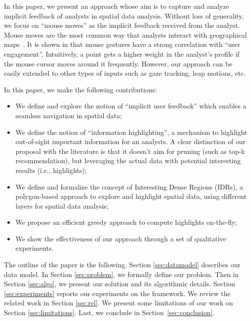 \documentclass[sigconf,edbt]{acmart-edbt2019}
\begin{document}
\vspace{2pt}
In this paper, we present an approach whose aim is to capture and analyze implicit feedback of analysts in spatial data analysis. Without loss of generality, we focus on ``mouse moves'' as the implicit feedback received from the analyst. Mouse moves are the most common way that analysts interact with geographical maps~\cite{Chen:2001}. It is shown in \cite{Arapakis:2014} that mouse gestures have a strong correlation with ``user engagement''. Intuitively, a point gets a higher weight in the analyst's profile if the mouse cursor moves around it frequently.  However, our approach can be easily extended to other types of inputs such as gaze tracking, leap motions, etc.

\vspace{2pt}
 In this paper, we make the following contributions:

\begin{itemize}[leftmargin=*]
  \item We define and explore the notion of ``implicit user feedback'' which enables a seamless navigation in spatial data;
  \item We define the notion of ``information highlighting'', a mechanism to highlight out-of-sight important information for an	analysts. A clear distinction of our proposal with the literature is that it doesn't aim for pruning (such as top-k recommendation), but leveraging the actual data with potential interesting results (i.e., highlights);
  \item  We define and formalize the concept of Interesting Dense Regions (IDRs), a polygon-based approach to explore and highlight spatial data, using different layers for spatial data analysis;
  \item We propose an efficient greedy approach to compute highlights on-the-fly;
  \item We show the effectiveness of our approach through a set of qualitative experiments.
\end{itemize}  

\vspace{2pt}
The outline of the paper is the following. Section \ref{sec:datamodel} describes our data model. In Section \ref{sec:problem}, we formally define our problem. Then in Section \ref{sec:algo}, we present our solution and its algorithmic details. Section  \ref{sec:experiments} reports our experiments on the framework. We review the related work in Section \ref{sec:rel}. We present some limitations of our work on Section \ref{sec:limitations}. Last, we conclude in Section~\ref{sec:conclusion}.
\end{document}
